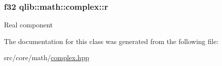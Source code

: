 \subsubsection[{\texorpdfstring{r}{r}}]{\setlength{\rightskip}{0pt plus 5cm}f32 qlib\+::math\+::complex\+::r}\hypertarget{classqlib_1_1math_1_1complex_aceb455ba091019bbd625fdaf529a0107}{}\label{classqlib_1_1math_1_1complex_aceb455ba091019bbd625fdaf529a0107}
Real component 

The documentation for this class was generated from the following file\+:\begin{DoxyCompactItemize}
\item 
src/core/math/\hyperlink{complex_8hpp}{complex.\+hpp}\end{DoxyCompactItemize}
